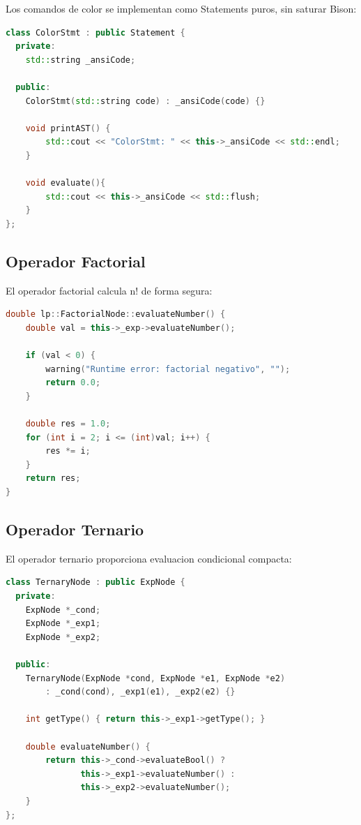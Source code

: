 \documentclass[11pt,a4paper]{article}
\begin{document}
Los comandos de color se implementan como Statements puros, sin saturar Bison:

\begin{lstlisting}[language=C++, caption={ColorStmt - Statements de color}]
class ColorStmt : public Statement {
  private:
    std::string _ansiCode;

  public:
    ColorStmt(std::string code) : _ansiCode(code) {}
    
    void printAST() { 
        std::cout << "ColorStmt: " << this->_ansiCode << std::endl; 
    }

    void evaluate(){
        std::cout << this->_ansiCode << std::flush;
    }
};
\end{lstlisting}

\subsection{Operador Factorial}

El operador factorial calcula n! de forma segura:

\begin{lstlisting}[language=C++, caption={FactorialNode - Calculo factorial}]
double lp::FactorialNode::evaluateNumber() {
    double val = this->_exp->evaluateNumber();
    
    if (val < 0) {
        warning("Runtime error: factorial negativo", "");
        return 0.0;
    }
    
    double res = 1.0;
    for (int i = 2; i <= (int)val; i++) {
        res *= i;
    }
    return res;
}
\end{lstlisting}

\subsection{Operador Ternario}

El operador ternario proporciona evaluacion condicional compacta:

\begin{lstlisting}[language=C++, caption={TernaryNode - Operador ternario}]
class TernaryNode : public ExpNode {
  private:
    ExpNode *_cond;
    ExpNode *_exp1;
    ExpNode *_exp2;

  public:
    TernaryNode(ExpNode *cond, ExpNode *e1, ExpNode *e2) 
        : _cond(cond), _exp1(e1), _exp2(e2) {}

    int getType() { return this->_exp1->getType(); }

    double evaluateNumber() {
        return this->_cond->evaluateBool() ? 
               this->_exp1->evaluateNumber() : 
               this->_exp2->evaluateNumber();
    }
};
\end{lstlisting}
\end{document}

